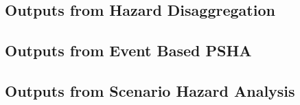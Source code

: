 \subsection{Outputs from Hazard Disaggregation}
\label{subsec:output_hazard_disaggregation}


\subsection{Outputs from Event Based PSHA}
\label{subsec:output_event_based_psha}


\subsection{Outputs from Scenario Hazard Analysis}
\label{subsec:output_scenario_hazard}

